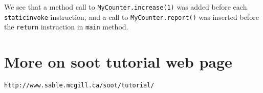 \documentclass[12pt]{article}
\begin{document}
\noindent
We see that a method call to {\tt MyCounter.increase(1)} was added before
each {\tt staticinvoke} instruction, and a call to {\tt MyCounter.report()}
was inserted before the {\tt return} instruction in {\tt main} method.

\section{More on soot tutorial web page}
{\tt http://www.sable.mcgill.ca/soot/tutorial/}
\end{document}
